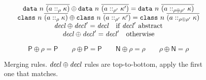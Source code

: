 \begin{figure}
\[
\begin{array}{c}
\texttt{data}~n~\overline{(a ::_\rho \kappa)} \oplus \texttt{data}~n~\overline{(a ::_{\rho'} \kappa')} = \texttt{data}~n~\overline{(a ::_{\rho \oplus \rho'} \kappa)} \\
\texttt{class}~n~\overline{(a ::_\rho \kappa)} \oplus \texttt{class}~n~\overline{(a ::_{\rho'} \kappa')} = \texttt{class}~n~\overline{(a ::_{\rho \oplus \rho'} \kappa)} \\
\mathit{decl} \oplus \mathit{decl}' = \mathit{decl} \quad \textrm{if}~\mathit{decl}'~\textrm{abstract}\\
\mathit{decl} \oplus \mathit{decl}' = \mathit{decl}' \quad \textrm{otherwise}\\
\end{array}
\]


\[
\textsf{P} \oplus \rho = \textsf{P} \qquad
\rho \oplus \textsf{P} = \textsf{P} \qquad
\textsf{N} \oplus \rho = \rho \qquad
\rho \oplus \textsf{N} = \rho
\]

\caption{Merging rules.  $\mathit{decl} \oplus \mathit{decl}$ rules are top-to-bottom, apply the first one that matches.}
\label{typing:merging}
\end{figure}

